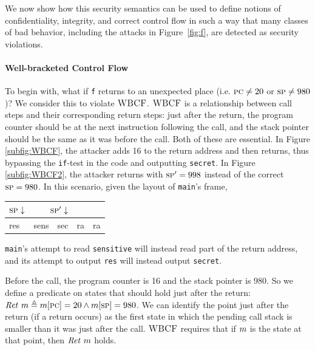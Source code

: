 \documentclass[10pt,conference]{ieeetran}%
\theoremstyle{definition}
\begin{document}
We now show how this security semantics can be used to define notions of confidentiality,
integrity, and correct control flow in such a way that many classes of
bad behavior, including the attacks in Figure~\ref{fig:f}, are
detected as security violations.

\paragraph*{Well-bracketed Control Flow}

To begin with, what if {\tt f} returns to an unexpected place (i.e. \(\textsc{pc} \neq 20\) or
\(\textsc{sp} \neq 980\))? We consider this to violate \(\textnormal{\sc WBCF}\). \(\textnormal{\sc WBCF}\) is a relationship between
call steps and their corresponding return steps: just after the return, the program
counter should be at the next instruction following the call,
and the stack pointer should be the same as it was before the call.
Both of these are essential. In Figure \ref{subfig:WBCF}, the attacker adds
16 to the return address and then returns, thus bypassing the {\tt if}-test in the code and outputting
{\tt secret}.
In Figure \ref{subfig:WBCF2}, the attacker returns with \(\textsc{sp}' = 998\) instead of the
correct \(\textsc{sp} = 980\). In this scenario, given the layout of {\tt main}'s frame,
\begin{center}
\begin{tabular}{| l | l | l | l | l |}
  \multicolumn{1}{r}{\(\textsc{sp} \downarrow\)} &
  \multicolumn{2}{r}{\(\textsc{sp}' \downarrow\)} \\
  \hline
  res & sens & sec & ra & ra \\
  \hline
\end{tabular}
\end{center}

\vspace{\abovedisplayskip}

\noindent
{\tt main}'s attempt to read {\tt sensitive} will instead
read part of the return address, and its attempt to output
{\tt res} will instead output {\tt secret}.

Before the call, the program counter is 16 and the stack pointer is 980.
So we define a predicate on states that should hold just after the return:
\(\mathit{Ret}\ m \triangleq m[\textsc{pc}] = 20 \wedge m[\textsc{sp}] = 980\).
%
We can identify the point just after the return (if a return occurs)
as the first state in which the pending call stack is smaller than it was
just after the call.
\(\textnormal{\sc WBCF}\) requires that if \(m\) is the state at that point, then \(\mathit{Ret} ~ m\) holds.
\end{document}
